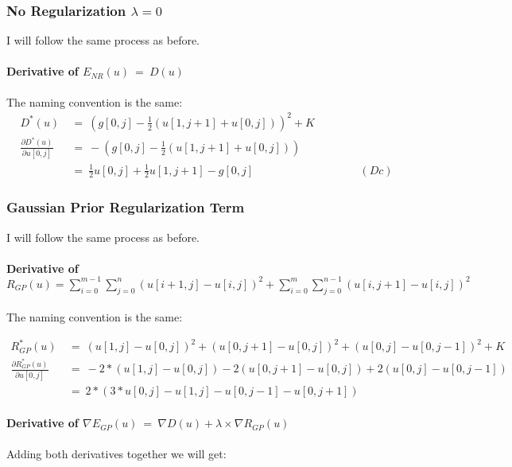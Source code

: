 \documentclass{report}
\begin{document}
			\subsubsection{No Regularization $\lambda = 0$}
			\startsubsection
				I will follow the same process as before.
				\vspace{-0.4cm} \paragraph{Derivative of  $E_{NR}(u) \ = \ D(u)$}
				\startsubsection
					The naming convention is the same:
					\vspace{-0.2cm}
					\begin{align*}
						D^*(u) \ & = \ (g[0,j] - \frac{1}{2} (u[1,j+1] + u[0,j]))^2 + K \\
						\frac{\partial D^*(u)}{\partial u[0,j]} \ & = \ - (g[0,j] - \frac{1}{2} (u[1,j+1] + u[0,j])) \\
						& = \ \frac{1}{2} u[0,j]  + \frac{1}{2} u[1,j+1] - g[0,j] \hspace{4cm} (Dc)
					\end{align*}
				\closesection
			\closesection
			\subsubsection{Gaussian Prior Regularization Term}
			\startsubsection
				I will follow the same process as before.
				\vspace{-0.4cm} \paragraph{Derivative of $R_{GP}(u) = \sum_{i=0}^{m-1} \sum_{j=0}^{n} ( u[i+1,j] - u[i,j] )^2 + \sum_{i=0}^{m} \sum_{j=0}^{n-1} ( u[i,j+1] - u[i,j] )^2$}
				\startsubsection
					\vspace{0.2cm} The naming convention is the same:
				\closesection
				\begin{adjustwidth}{-4em}{}
					\vspace{-0.5cm}
					\begin{align*}
						R_{GP}^*(u) \ & = \ (u[1,j] - u[0,j])^2 + (u[0,j+1] - u[0,j])^2 + (u[0,j] - u[0,j-1])^2 + K \\
						\frac{\partial R_{GP}^*(u)}{\partial u[0,j]} \ & = \ -2 * (u[1,j] - u[0,j]) - 2 (u[0,j+1] - u[0,j]) + 2 (u[0,j] - u[0,j-1]) \\
						& = \ 2 * (3 * u[0,j] - u[1,j] - u[0,j-1] - u[0,j+1])
					\end{align*}
				\end{adjustwidth}
				\vspace{-0.4cm} \paragraph{Derivative of $\nabla E_{GP}(u) \ = \ \nabla D(u) + \lambda \times \nabla R_{GP}(u)$}
				\startsubsection
					Adding both derivatives together we will get:
				\closesection
			\closesection
\end{document}
